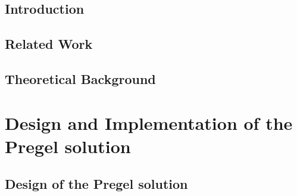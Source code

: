 \documentclass{legrand}
\begin{document}







\setcounter{page}{0}



\tableofcontents

\listoffigures

\listoftables


\chapter{Introduction}
\setcounter{page}{0} %
\label{chapter:intro}


\chapter{Related Work}
\label{chapter:related}


\chapter{Theoretical Background}
\label{chapter:theory}


\part{Design and Implementation of the Pregel solution}

\chapter{Design of the Pregel solution}
\label{chapter:design}

\end{document}
